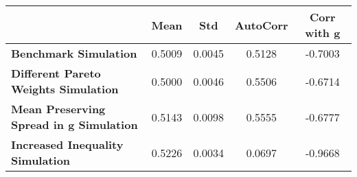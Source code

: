 \begin{tiny}\begin{tabular}{|l|c|c|c|c|}
\hline
&\textbf{Mean}&\textbf{Std}&\textbf{AutoCorr}&\textbf{Corr with g}\\\hline
\textbf{Benchmark Simulation}&0.5009&0.0045&0.5128&-0.7003\\\hline
\textbf{Different Pareto Weights Simulation}&0.5000&0.0046&0.5506&-0.6714\\\hline
\textbf{Mean Preserving Spread in g Simulation}&0.5143&0.0098&0.5555&-0.6777\\\hline
\textbf{Increased Inequality Simulation}&0.5226&0.0034&0.0697&-0.9668\\\hline
\end{tabular}
\end{tiny}